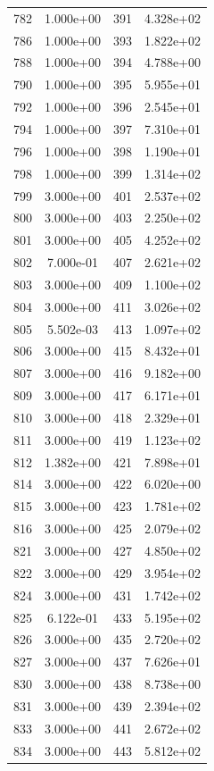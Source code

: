 \documentclass[12pt]{article}
\begin{document}
\begin{longtable}{@{}cccc@{}}
782 & 1.000e+00 & 391 & 4.328e+02 \\
786 & 1.000e+00 & 393 & 1.822e+02 \\
788 & 1.000e+00 & 394 & 4.788e+00 \\
790 & 1.000e+00 & 395 & 5.955e+01 \\
792 & 1.000e+00 & 396 & 2.545e+01 \\
794 & 1.000e+00 & 397 & 7.310e+01 \\
796 & 1.000e+00 & 398 & 1.190e+01 \\
798 & 1.000e+00 & 399 & 1.314e+02 \\
799 & 3.000e+00 & 401 & 2.537e+02 \\
800 & 3.000e+00 & 403 & 2.250e+02 \\
801 & 3.000e+00 & 405 & 4.252e+02 \\
802 & 7.000e-01 & 407 & 2.621e+02 \\
803 & 3.000e+00 & 409 & 1.100e+02 \\
804 & 3.000e+00 & 411 & 3.026e+02 \\
805 & 5.502e-03 & 413 & 1.097e+02 \\
806 & 3.000e+00 & 415 & 8.432e+01 \\
807 & 3.000e+00 & 416 & 9.182e+00 \\
809 & 3.000e+00 & 417 & 6.171e+01 \\
810 & 3.000e+00 & 418 & 2.329e+01 \\
811 & 3.000e+00 & 419 & 1.123e+02 \\
812 & 1.382e+00 & 421 & 7.898e+01 \\
814 & 3.000e+00 & 422 & 6.020e+00 \\
815 & 3.000e+00 & 423 & 1.781e+02 \\
816 & 3.000e+00 & 425 & 2.079e+02 \\
821 & 3.000e+00 & 427 & 4.850e+02 \\
822 & 3.000e+00 & 429 & 3.954e+02 \\
824 & 3.000e+00 & 431 & 1.742e+02 \\
825 & 6.122e-01 & 433 & 5.195e+02 \\
826 & 3.000e+00 & 435 & 2.720e+02 \\
827 & 3.000e+00 & 437 & 7.626e+01 \\
830 & 3.000e+00 & 438 & 8.738e+00 \\
831 & 3.000e+00 & 439 & 2.394e+02 \\
833 & 3.000e+00 & 441 & 2.672e+02 \\
834 & 3.000e+00 & 443 & 5.812e+02 \\

\end{longtable}
\end{document}
